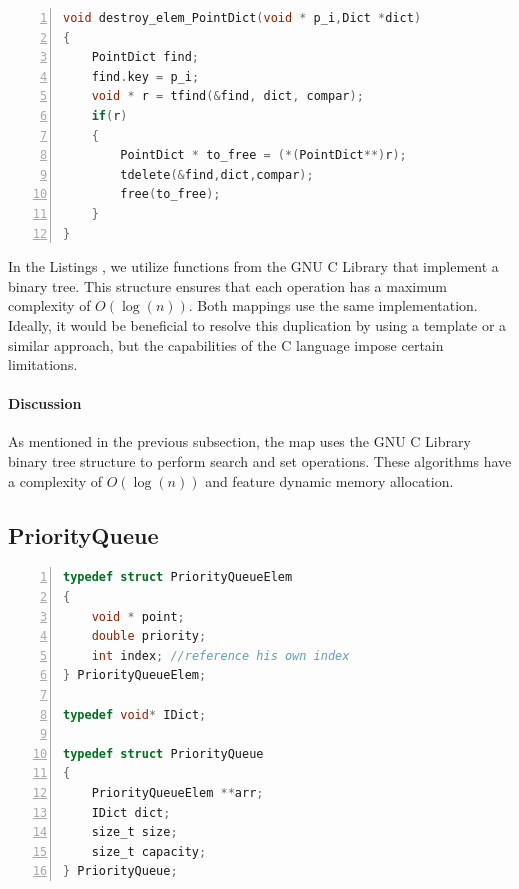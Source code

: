 \begin{lstlisting}[float=ht,language=C, % Spécifie le langage du code
caption={Methods destroy\_elem for the Map implementation in C.}, % Légende du listing
label=lst:pmap_c, % Étiquette pour référencer le listing
numbers=left,
numberstyle=\tiny\color{gray},
stepnumber=1,
frame=single,
breaklines=true,
postbreak=\mbox{\textcolor{red}{$\hookrightarrow$}\space},
showstringspaces=false
]
void destroy_elem_PointDict(void * p_i,Dict *dict)
{
	PointDict find;
	find.key = p_i;
	void * r = tfind(&find, dict, compar);
	if(r)
	{
		PointDict * to_free = (*(PointDict**)r);
		tdelete(&find,dict,compar);
		free(to_free);
	}
}

\end{lstlisting} 

In the Listings , we utilize functions from the GNU C Library that implement a binary tree. This structure ensures that each operation has a maximum complexity of \( O(\log(n)) \). Both mappings use the same implementation. Ideally, it would be beneficial to resolve this duplication by using a template or a similar approach, but the capabilities of the C language impose certain limitations.


\paragraph{Discussion}
As mentioned in the previous subsection, the map uses the GNU C Library binary tree structure to perform search and set operations. These algorithms have a complexity of \( O(\log(n)) \) and feature dynamic memory allocation.

\subsection{PriorityQueue}

\begin{lstlisting}[float=ht,language=C, % Spécifie le langage du code
caption={C code implementation of the PriorityQueue.}, % Légende du listing
label=lst:prqueue_c, % Étiquette pour référencer le listing
numbers=left,
numberstyle=\tiny\color{gray},
stepnumber=1,
frame=single,
breaklines=true,
postbreak=\mbox{\textcolor{red}{$\hookrightarrow$}\space},
showstringspaces=false
]
typedef struct PriorityQueueElem
{
	void * point;
	double priority;
	int index; //reference his own index
} PriorityQueueElem;

typedef void* IDict;

typedef struct PriorityQueue
{
	PriorityQueueElem **arr;
	IDict dict;
	size_t size;
	size_t capacity;
} PriorityQueue;

\end{lstlisting} 

